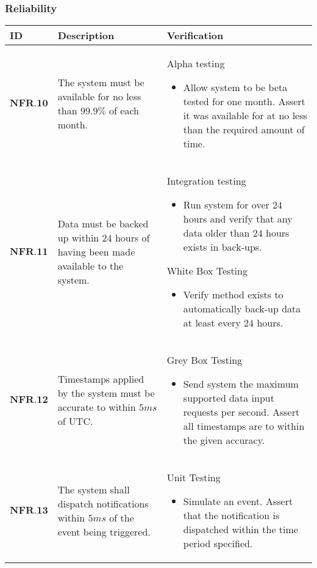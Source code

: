 \subsubsection{Reliability}
\begin{longtable}[H]{|p{1.5cm}|p{4.5cm}|p{10.5cm}|}
    \hline
    \cellcolor{titleColor}\textbf{ID} & \cellcolor{titleColor}\textbf{Description} & \cellcolor{titleColor}\textbf{Verification} \\ \hline
   $ \textbf{NFR.10} $ & The system must be available for no less than $99.9\%$ of each month. & Alpha testing\begin{itemize}\item Allow system to be beta tested for one month. Assert it was available for at no less than the required amount of time.\end{itemize} \\ \hline
    $ \textbf{NFR.11} $ & Data must be backed up within $24$ hours of having been made available to the system. & Integration testing\begin{itemize}\item Run system for over $24$ hours and verify that any data older than $24$ hours exists in back-ups.\end{itemize}White Box Testing\begin{itemize}\item Verify method exists to automatically back-up data at least every $24$ hours. \end{itemize} \\ \hline
   $ \textbf{NFR.12} $ & Timestamps applied by the system must be accurate to within $5ms$ of UTC. & Grey Box Testing\begin{itemize}\item Send system the maximum supported data input requests per second. Assert all timestamps are to within the given accuracy.\end{itemize} \\ \hline
   $ \textbf{NFR.13} $ & The system shall dispatch notifications within $5ms$ of the event being triggered. & Unit Testing\begin{itemize}\item Simulate an event. Assert that the notification is dispatched within the time period specified.\end{itemize} \\ \hline
\end{longtable}
